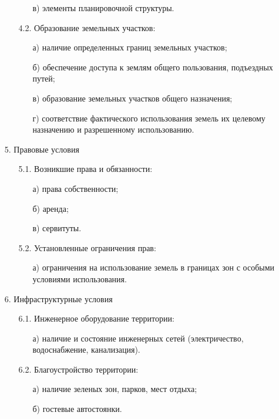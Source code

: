 \begin{enumerate}
\begin{enumerate}
\begin{enumerate}
            \item[в)] элементы планировочной структуры.
        \end{enumerate}
        \item[4.2.] Образование земельных участков:
        \begin{enumerate}
            \item[а)] наличие определенных границ земельных участков;
            \item[б)] обеспечение доступа к землям общего пользования, подъездных путей;
            \item[в)] образование земельных участков общего назначения;
            \item[г)] соответствие фактического использования земель их целевому назначению и разрешенному использованию.
        \end{enumerate}
    \end{enumerate}
    \item[5.] Правовые условия
    \begin{enumerate}
        \item[5.1.] Возникшие права и обязанности:
        \begin{enumerate}
            \item[а)] права собственности;
            \item[б)] аренда;
            \item[в)] сервитуты.
        \end{enumerate}
        \item[5.2.] Установленные ограничения прав:
        \begin{enumerate}
            \item[а)] ограничения на использование земель в границах зон с особыми условиями использования.
        \end{enumerate}
    \end{enumerate}
    \item[6.] Инфраструктурные условия
    \begin{enumerate}
        \item[6.1.] Инженерное оборудование территории:
        \begin{enumerate}
            \item[а)] наличие и состояние инженерных сетей (электричество, водоснабжение, канализация).
        \end{enumerate}
        \item[6.2.] Благоустройство территории:
        \begin{enumerate}
            \item[а)] наличие зеленых зон, парков, мест отдыха;
            \item[б)] гостевые автостоянки.
        \end{enumerate}
    \end{enumerate}
\end{enumerate}

